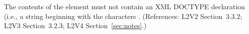 The contents of the  element must not contain an XML
DOCTYPE declaration (i.e., a string beginning with the characters
.  (References: L2V2 Section~3.3.2;
L2V3 Section~3.2.3; L2V4 Section~\ref{sec:notes}.)
